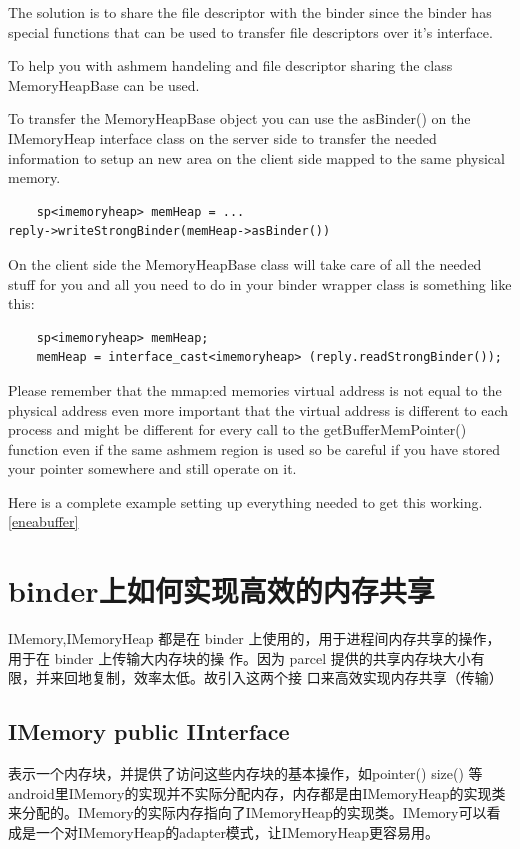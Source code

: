 \documentclass[a4paper,11pt]{article}
\begin{document}
The solution is to share the file descriptor with the binder since the binder
has special functions that can be used to transfer file descriptors over it's
interface.

To help you with ashmem handeling and file descriptor sharing the class
MemoryHeapBase can be used. 

To transfer the MemoryHeapBase object you can use the asBinder() on the
IMemoryHeap interface class on the server side to transfer the needed
information to setup an new area on the client side mapped to the same
physical memory.
\begin{lstlisting}
    sp<imemoryheap> memHeap = ...
reply->writeStrongBinder(memHeap->asBinder())
\end{lstlisting}

On the client side the MemoryHeapBase class will take care of all the needed
stuff for you and all you need to do in your binder wrapper class is something
like this:
\begin{lstlisting}
    sp<imemoryheap> memHeap;
    memHeap = interface_cast<imemoryheap> (reply.readStrongBinder());
\end{lstlisting}
Please remember that the mmap:ed memories virtual address is not equal to the
physical address even more important that the virtual address is different to
each process and might be different for every call to the
getBufferMemPointer() function even if the same ashmem region is used so be
careful if you have stored your pointer somewhere and still operate on it.

Here is a complete example setting up everything needed to get this working.
\ref{eneabuffer}

\section{binder上如何实现高效的内存共享}
IMemory,IMemoryHeap 都是在 binder 上使用的，用于进程间内存共享的操作，用于在 binder 上传输大内存块的操
作。因为 parcel 提供的共享内存块大小有限，并来回地复制，效率太低。故引入这两个接
口来高效实现内存共享（传输）

\subsection{IMemory public IInterface}
表示一个内存块，并提供了访问这些内存块的基本操作，如pointer() size() 等
android里IMemory的实现并不实际分配内存，内存都是由IMemoryHeap的实现类来分配的。IMemory的实际内存指向了IMemoryHeap的实现类。IMemory可以看成是一个对IMemoryHeap的adapter模式，让IMemoryHeap更容易用。
\end{document}
